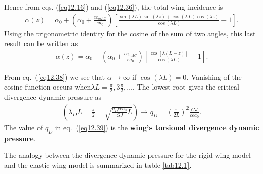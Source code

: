 \documentclass{AeroStructure-ERJohnson}
\begin{document}
\vspace*{-1pc}

Hence from eqs. (\ref{eq12.16}) and (\ref{eq12.36}), the total wing incidence is
\begin{align}\label{eq12.37}
\alpha(z)=\alpha_{0}+\left(\alpha_{0}+\frac{c c_{m A C}}{e a_{0}}\right)\left[\frac{\sin (\lambda L) \sin (\lambda z)+\cos (\lambda L) \cos (\lambda z)}{\cos (\lambda L)}-1\right].
\end{align}
Using the trigonometric identity for the cosine of the sum of two angles, this last result can be written as
\begin{align}\label{eq12.38}
\alpha(z)=\alpha_{0}+\left(\alpha_{0}+\frac{c c_{m A C}}{e a_{0}}\right)\left[\frac{\cos [\lambda(L-z)]}{\cos (\lambda L)}-1\right].
\end{align}

From eq.~(\ref{eq12.38}) we see that $\alpha \rightarrow \infty$ if $\cos (\lambda L)=0$. Vanishing of the cosine function occurs when\break $\lambda L=\frac{\pi}{2}, 3 \frac{\pi}{2},\ldots.$ The lowest root gives the critical divergence dynamic pressure as
\begin{align}\label{eq12.39}
\left(\lambda_{D} L=\frac{\pi}{2}=\sqrt{\frac{q_{D} c e a_{0}}{G J} L}\right) \rightarrow q_{D}=\left(\frac{\pi}{2 L}\right)^{2} \frac{G J}{c e a_{0}}.
\end{align}
The value of $q_{D}$ in eq.~(\ref{eq12.39}) is the \textbf{wing's torsional divergence dynamic pressure}.

The analogy between the divergence dynamic pressure for the rigid wing model and the elastic wing model is summarized in table \ref{tab12.1}.

\begin{table}[H]
\vspace*{-10pt}
\end{table}
\end{document}
